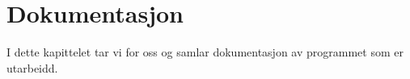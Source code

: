\chapter{Dokumentasjon}
\thispagestyle{fancy}

I dette kapittelet tar vi for oss og samlar dokumentasjon av programmet som er utarbeidd.